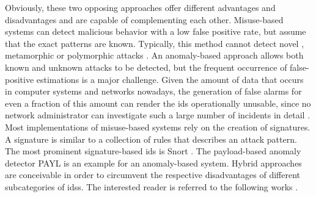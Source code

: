 \documentclass[../../../main.tex]{subfiles}
\begin{document}
Obviously, these two opposing approaches offer different advantages and disadvantages and are capable of complementing each other. Misuse-based systems can detect malicious behavior with a low false positive rate, but assume that the exact patterns  are known. Typically, this method cannot detect novel \cite[403]{whitman_principles_2018}, metamorphic or polymorphic attacks \cite[236]{szor2005art}. An anomaly-based approach allows both known and unknown attacks to be detected, but the frequent occurrence of false-positive estimations is a major challenge. Given the amount of data that occurs in computer systems and networks nowadays, the generation of false alarms for even a fraction of this amount can render the \gls{ids} operationally unusable, since no network administrator can investigate such a large number of incidents in detail \cite{axelsson2000base}. Most implementations of misuse-based systems rely on the creation of signatures. A signature is similar to a collection of rules that describes an attack pattern. The most prominent signature-based \gls{ids} is Snort \cite{roesch1999snort}. The payload-based anomaly detector PAYL \cite{wang2004anomalous} is an example for an anomaly-based system. Hybrid approaches are conceivable in order to circumvent the respective disadvantages of different subcategories of \glspl{ids}. The interested reader is referred to the following works \cite{DEPREN2005713} \cite{zhang2006hybrid} \cite{beer_hybrid2021}.
\end{document}
